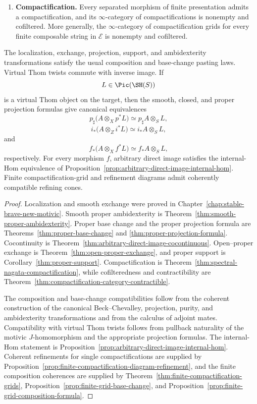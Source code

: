 \begin{theorem}
\begin{enumerate}
    \item \textbf{Compactification.}
    Every separated morphism of finite presentation admits a compactification,
    and its \(\infty\)-category of compactifications is nonempty and
    cofiltered.  More generally, the \(\infty\)-category of compactification
    grids for every finite composable string in \(\mathcal E\) is nonempty
    and cofiltered.
\end{enumerate}

The localization, exchange, projection, support, and ambidexterity
transformations satisfy the usual composition and base-change pasting laws.
Virtual Thom twists commute with inverse image.  If
\[
    L\in\Pic(\SH(S))
\]
is a virtual Thom object on the target, then the smooth, closed, and proper
projection formulas give canonical equivalences
\[
    p_\sharp\bigl(A\otimes_Xp^*L\bigr)
    \simeq
    p_\sharp A\otimes_SL,
\]
\[
    i_*\bigl(A\otimes_Zi^*L\bigr)
    \simeq
    i_*A\otimes_SL,
\]
and
\[
    f_*\bigl(A\otimes_Xf^*L\bigr)
    \simeq
    f_*A\otimes_SL,
\]
respectively.
For every morphism \(f\), arbitrary direct image satisfies the internal-Hom
equivalence of
Proposition~\ref{prop:arbitrary-direct-image-internal-hom}.  Finite
compactification-grid and refinement diagrams admit coherently compatible
refining cones.
\end{theorem}

\begin{proof}
Localization and smooth exchange were proved in
Chapter~\ref{chap:stable-brave-new-motivic}.  Smooth proper ambidexterity is
Theorem~\ref{thm:smooth-proper-ambidexterity}.  Proper base change and the
proper projection formula are
Theorems~\ref{thm:proper-base-change} and
\ref{thm:proper-projection-formula}.  Cocontinuity is
Theorem~\ref{thm:arbitrary-direct-image-cocontinuous}.  Open--proper exchange
is Theorem~\ref{thm:open-proper-exchange}, and proper support is
Corollary~\ref{thm:proper-support}.  Compactification is
Theorem~\ref{thm:spectral-nagata-compactification}, while cofilteredness and
contractibility are
Theorem~\ref{thm:compactification-category-contractible}.

The composition and base-change compatibilities follow from the coherent
construction of the canonical Beck--Chevalley, projection, purity, and
ambidexterity transformations and from the calculus of adjoint mates.
Compatibility with virtual Thom twists follows from pullback naturality of
the motivic \(J\)-homomorphism and the appropriate projection formulas.
The internal-Hom statement is
Proposition~\ref{prop:arbitrary-direct-image-internal-hom}.  Coherent
refinements for single compactifications are supplied by
Proposition~\ref{prop:finite-compactification-diagram-refinement}, and the
finite composition coherences are supplied by
Theorem~\ref{thm:finite-compactification-grids},
Proposition~\ref{prop:finite-grid-base-change}, and
Proposition~\ref{prop:finite-grid-composition-formula}.
\end{proof}

